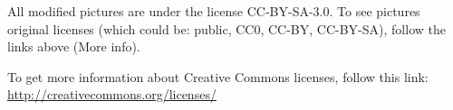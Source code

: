 \documentclass{imgBook}
\begin{document}



\backmatter

{\scriptsize \authorsthanks}

All modified pictures are under the license CC-BY-SA-3.0. 
To see pictures original licenses (which could be: public, CC0, CC-BY, CC-BY-SA), follow the links above (More info).

To get more information about Creative Commons licenses, follow this link: \url{http://creativecommons.org/licenses/}


\end{document}
